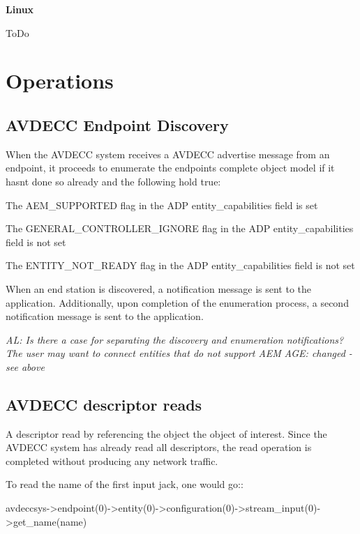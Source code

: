 {\bfseries Linux}

To\+Do

\section*{Operations }

\subsection*{A\+V\+D\+E\+CC Endpoint Discovery }

When the A\+V\+D\+E\+CC system receives a A\+V\+D\+E\+CC advertise message from an endpoint, it proceeds to enumerate the endpoint\textquotesingle{}s complete object model if it hasn\textquotesingle{}t done so already and the following hold true\+:


\begin{DoxyItemize}
\item The A\+E\+M\+\_\+\+S\+U\+P\+P\+O\+R\+T\+ED flag in the A\+DP entity\+\_\+capabilities field is set
\item The G\+E\+N\+E\+R\+A\+L\+\_\+\+C\+O\+N\+T\+R\+O\+L\+L\+E\+R\+\_\+\+I\+G\+N\+O\+RE flag in the A\+DP entity\+\_\+capabilities field is not set
\item The E\+N\+T\+I\+T\+Y\+\_\+\+N\+O\+T\+\_\+\+R\+E\+A\+DY flag in the A\+DP entity\+\_\+capabilities field is not set
\end{DoxyItemize}

When an end station is discovered, a notification message is sent to the application. Additionally, upon completion of the enumeration process, a second notification message is sent to the application.

{\itshape AL\+: Is there a case for separating the discovery and enumeration notifications? The user may want to connect entities that do not support A\+EM} {\itshape A\+GE\+: changed -\/ see above}

\subsection*{A\+V\+D\+E\+CC descriptor reads }

A descriptor read by referencing the object the object of interest. Since the A\+V\+D\+E\+CC system has already read all descriptors, the read operation is completed without producing any network traffic.

To read the name of the first input jack, one would go\+:\+: \begin{DoxyVerb}avdeccsys->endpoint(0)->entity(0)->configuration(0)->stream_input(0)->get_name(name) 
\end{DoxyVerb}


